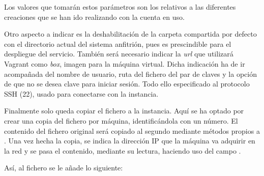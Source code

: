Los valores que tomarán estos parámetros son los relativos a las diferentes creaciones que se han ido realizando con la cuenta en uso.

Otro aspecto a indicar es la deshabilitación de la carpeta compartida por defecto  con el directorio actual del sistema anfitrión, pues es prescindible para el despliegue del servicio. También será necesario indicar la \textit{url} que utilizará Vagrant como \textit{box}, imagen para la máquina virtual. Dicha indicación ha de ir acompañada del nombre de usuario, ruta del fichero del par de claves y la opción de que no se desea clave para iniciar sesión. Todo ello especificado al protocolo SSH (22), usado para conectarse con la instancia.

Finalmente solo queda copiar el fichero  a la instancia. Aquí se ha optado por crear una copia del fichero  por máquina, identificándola con un número. El contenido del fichero original será copiado al segundo mediante métodos propios a . Una vez hecha la copia, se indica la dirección IP que la máquina va adquirir en la red  y se pasa el contenido, mediante su lectura, haciendo uso del campo .

Así, al fichero  se le añade lo siguiente:

